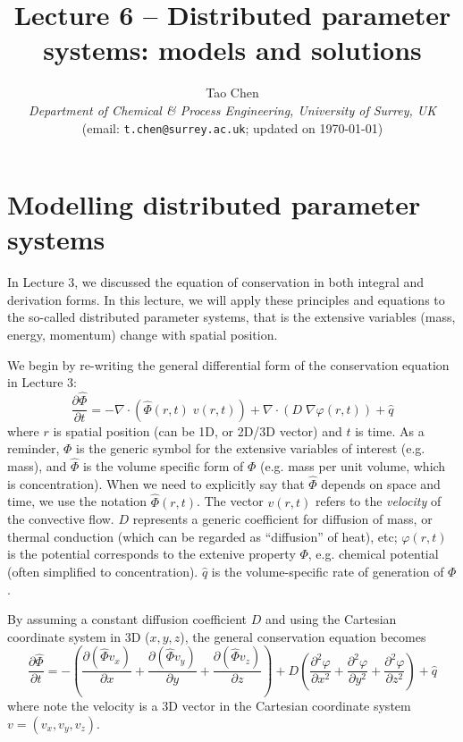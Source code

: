 \documentclass[a4paper,11pt]{article}
\title{\vspace{-2cm} Lecture 6 -- Distributed parameter systems: models and solutions}
\author{Tao Chen\\
{\small \emph{Department of Chemical \& Process Engineering, University of Surrey, UK}}\\
{\small (email: \texttt{t.chen@surrey.ac.uk}; \hspace{0.5cm} updated on \today )}
}
\date{}
\theoremstyle{definition}
\begin{document}
\maketitle

\vspace{-0.5cm}

\section{Modelling distributed parameter systems}

In Lecture 3, we discussed the equation of conservation in both integral and derivation forms.
In this lecture, we will apply these principles and equations to the so-called distributed parameter
systems, that is the extensive variables (mass, energy, momentum) change with spatial position.

We begin by re-writing the general differential form of the conservation equation
in Lecture 3:
\begin{equation} \label{eq:conserv_pds_1}
	\frac{\partial \hat{\Phi}}{\partial t} = - \nabla \cdot \left( \hat{\Phi}(r, t) \; v(r, t) \right) 
		+ \nabla \cdot \left( D \; \nabla \varphi(r, t) \right)	 + \hat{q}
\end{equation}
\noindent where $r$ is spatial position (can be 1D, or 2D/3D vector) and $t$ is time.
As a reminder, $\Phi$ is the generic symbol for the extensive variables of interest (e.g. mass),
and $\hat{\Phi}$ is the volume specific form of $\Phi$ (e.g. mass per unit volume, which is
concentration). When we need to explicitly say that $\hat{\Phi}$ depends on space and time,
we use the notation $\hat{\Phi}(r, t)$. The vector $v(r, t)$ refers to the \emph{velocity} of the convective
flow. $D$ represents a generic coefficient for diffusion of mass, or thermal conduction (which can be regarded as 
``diffusion'' of heat), etc; $\varphi(r, t)$ is the potential corresponds to the extenive property $\Phi$, e.g.
chemical potential (often simplified to concentration). $\hat{q}$ is the volume-specific rate of
generation of $\Phi$.

By assuming a constant diffusion coefficient $D$ and using the Cartesian coordinate system in 3D ($x, y, z$),
the general conservation equation becomes
\begin{equation} \label{eq:conserv_pds_2}
	\frac{\partial \hat{\Phi}}{\partial t} = - \left( \frac{\partial ( \hat{\Phi} v_x )}{\partial x} 
				+  \frac{\partial ( \hat{\Phi} v_y )}{\partial y} + \frac{\partial ( \hat{\Phi} v_z )}{\partial z} \right)
		+ D \left( \frac{\partial^2 \varphi}{\partial x^2} + \frac{\partial^2 \varphi}{\partial y^2} + \frac{\partial^2 \varphi}{\partial z^2} \right) 
		+ \hat{q}
\end{equation}
\noindent where note the velocity is a 3D vector in the Cartesian coordinate system $v = (v_x, v_y, v_z)$.
\end{document}
